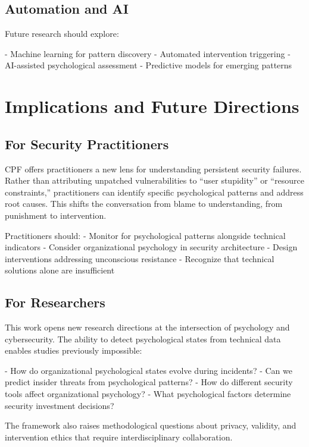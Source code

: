 \documentclass[11pt,a4paper]{article}
\begin{document}
\subsection{Automation and AI}

Future research should explore:

- Machine learning for pattern discovery
- Automated intervention triggering
- AI-assisted psychological assessment
- Predictive models for emerging patterns

\section{Implications and Future Directions}

\subsection{For Security Practitioners}

CPF offers practitioners a new lens for understanding persistent security failures. Rather than attributing unpatched vulnerabilities to ``user stupidity'' or ``resource constraints,'' practitioners can identify specific psychological patterns and address root causes. This shifts the conversation from blame to understanding, from punishment to intervention.

Practitioners should:
- Monitor for psychological patterns alongside technical indicators
- Consider organizational psychology in security architecture
- Design interventions addressing unconscious resistance
- Recognize that technical solutions alone are insufficient

\subsection{For Researchers}

This work opens new research directions at the intersection of psychology and cybersecurity. The ability to detect psychological states from technical data enables studies previously impossible:

- How do organizational psychological states evolve during incidents?
- Can we predict insider threats from psychological patterns?
- How do different security tools affect organizational psychology?
- What psychological factors determine security investment decisions?

The framework also raises methodological questions about privacy, validity, and intervention ethics that require interdisciplinary collaboration.
\end{document}
